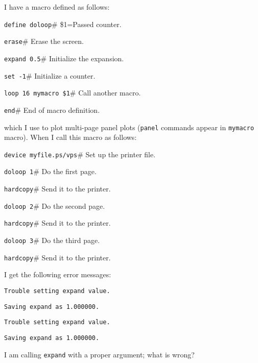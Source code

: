 I have a macro defined as follows:
\begin{wiplist}%
  \item {\tt define doloop}\hfill\# \$1=Passed counter.
\samepage
  \item [\wipd] {\tt erase}\hfill\# Erase the screen.
  \item [\wipd] {\tt expand 0.5}\hfill\# Initialize the expansion.
  \item [\wipd] {\tt set  -1}\hfill\# Initialize a counter.
  \item [\wipd] {\tt loop 16 mymacro  \$1}\hfill\# Call another macro.
  \item [\wipd] {\tt end}\hfill\# End of macro definition.
\end{wiplist}
which I use to plot multi-page panel plots
({\tt panel} commands appear
in {\tt mymacro} macro).
When I call this macro as follows:
\begin{wiplist}%
  \item {\tt device myfile.ps/vps}\hfill\# Set up the printer file.
\samepage
  \item {\tt doloop 1}\hfill\# Do the first page.
  \item {\tt hardcopy}\hfill\# Send it to the printer.
  \item {\tt doloop 2}\hfill\# Do the second page.
  \item {\tt hardcopy}\hfill\# Send it to the printer.
  \item {\tt doloop 3}\hfill\# Do the third page.
  \item {\tt hardcopy}\hfill\# Send it to the printer.
\end{wiplist}
I get the following error messages:
\begin{wiplist}%
  \item [\ ] {\tt Trouble setting expand value.}
\samepage
  \item [\ ] {\tt Saving expand as 1.000000.}
  \item [\ ] {\tt Trouble setting expand value.}
  \item [\ ] {\tt Saving expand as 1.000000.}
\end{wiplist}
I am calling {\tt expand} with a proper argument; what is wrong?

